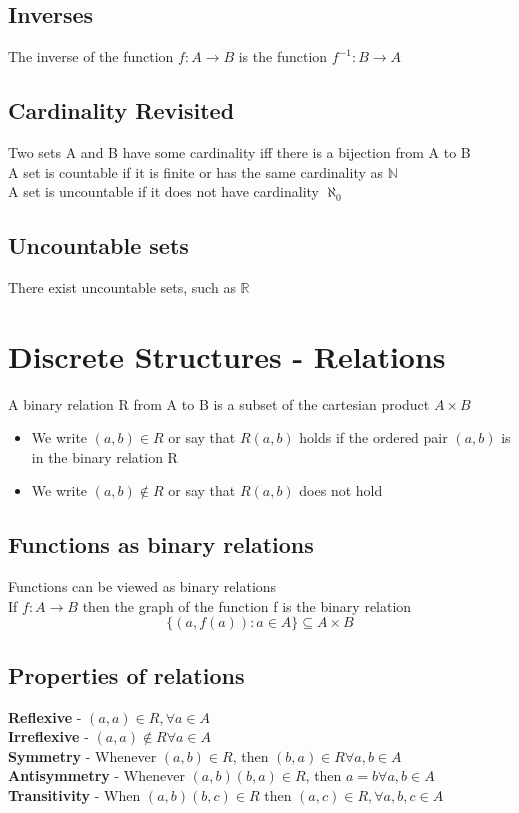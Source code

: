 \documentclass{article}[18pt]
\begin{document}
\subsection{Inverses}
The inverse of the function $f:A\rightarrow B$ is the function $f^{-1}:B\rightarrow A$
\subsection{Cardinality Revisited}
Two sets A and B have some cardinality iff there is a bijection from A to B\\
A set is countable if it is finite or has the same cardinality as $\mathbb{N}$\\
A set is uncountable if it does not have cardinality $\aleph_0$
\subsection{Uncountable sets}
There exist uncountable sets, such as $\mathbb{R}$
\section{Discrete Structures - Relations}
A binary relation R from A to B is a subset of the cartesian product $A\times B$
\begin{itemize}
	\item We write $(a,b)\in R$ or say that $R(a,b)$ holds if the ordered pair $(a,b)$ is in the binary relation R
	\item We write $(a,b)\notin R$ or say that $R(a,b)$ does not hold
\end{itemize}
\subsection{Functions as binary relations}
Functions can be viewed as binary relations\\
If $f:A\rightarrow B$ then the graph of the function f is the binary relation 
\[
\{(a, f(a)) : a \in A\} \subseteq A \times B
\]
\subsection{Properties of relations}
\textbf{Reflexive} - $(a,a)\in R, \forall a\in A$\\
\textbf{Irreflexive} - $(a,a)\notin R\forall a \in A$\\
\textbf{Symmetry} - Whenever $(a,b)\in R$, then $(b,a)\in R \forall a,b \in A$\\
\textbf{Antisymmetry} - Whenever $(a,b)(b,a)\in R$, then $a=b \forall a,b\in A$\\
\textbf{Transitivity} - When $(a,b)(b,c)\in R$ then $(a,c)\in R, \forall a,b,c\in A$
\end{document}
